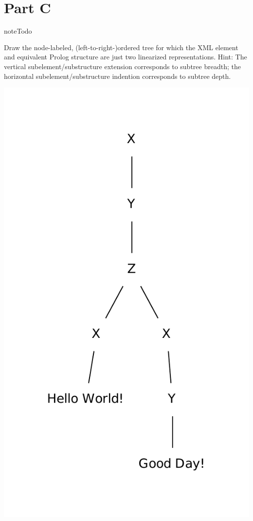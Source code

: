 \documentclass[letterpaper,10pt,english]{sphinxmanual}
\begin{document}
\section{Part C}
\label{assign0:part-c}
\begin{notice}{note}{Todo}

Draw the node-labeled, (left-to-right-)ordered tree for which the XML element and equivalent Prolog structure are just two linearized representations. Hint: The vertical subelement/substructure extension corresponds to subtree breadth; the horizontal subelement/substructure indention corresponds to subtree depth.
\end{notice}

\includegraphics{graphviz-ca9411c629b22c9cf6cf6dc318a5b73a7efe365a.pdf}
\end{document}

